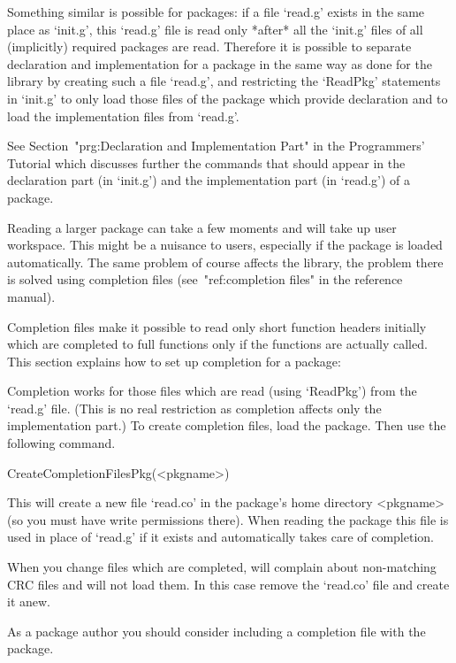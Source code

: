 Something similar  is possible for {\GAP} packages: if a file `read.g'
exists in the same place as `init.g',  this `read.g' file is read only
*after*  all  the `init.g' files   of  all (implicitly) required {\GAP}
packages  are read.  Therefore  it is possible to separate declaration
and implementation for a {\GAP} package in the same way as done for the
library  by  creating  such  a file   `read.g',   and restricting  the
`ReadPkg' statements  in  `init.g' to  only load   those  files of the
package which provide declaration and to load the implementation files
from `read.g'.

See Section~"prg:Declaration and Implementation Part" in the Programmers'
Tutorial which discusses further the commands that should appear in the
declaration part (in `init.g') and the implementation part (in `read.g')
of a package.


Reading a larger package can take a few moments and will take up user
workspace. This might be a nuisance to users, especially if the package is
loaded automatically.
The same problem of course affects the library, the problem there is solved
using completion files (see~"ref:completion files" in the reference manual).

Completion files make it possible to read only short function headers
initially which are completed to full functions only if the functions are
actually called.  This section explains how to set up completion for a {\GAP}
package:

Completion works for those files which are read (using `ReadPkg')
from the `read.g' file. (This is no real restriction as completion affects
only the implementation part.) To create completion files, load the {\GAP}
package. Then use the following command.

\>CreateCompletionFilesPkg(<pkgname>)

This will create a new file `read.co' in the {\GAP} package's home directory
<pkgname> (so you must have write permissions there). When reading the {\GAP}
package this file is used in place of `read.g' if it exists and automatically
takes care of completion.

When you change files which are completed, {\GAP} will complain about
non-matching CRC files and will not load them. In this case remove
the `read.co' file and create it anew.

As a {\GAP} package author you should consider including a completion file
with the package.

